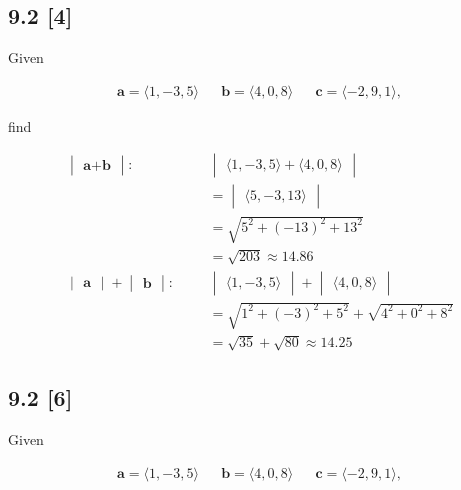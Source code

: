 \documentclass{article}
\begin{document}
\subsection*{9.2 [4]}
\setcounter{equation}{0}

Given

\begin{align}
    \textbf{a} = \langle1, -3, 5\rangle && \textbf{b} = \langle4, 0, 8\rangle && \textbf{c} = \langle-2, 9, 1\rangle,
\end{align}

find

\begin{align}
    \begin{vmatrix}
    \textbf{a} + \textbf{b}
    \end{vmatrix}: && &\text{} \begin{vmatrix}
    \langle1, -3, 5\rangle + \langle4, 0, 8\rangle
    \end{vmatrix}
    \\
    && &= \begin{vmatrix}
    \langle5, -3, 13\rangle
    \end{vmatrix}
    \\
    && &= \sqrt{5^2 + (-13)^2 + 13^2}
    \\
    && &= \sqrt{203} \approx 14.86
    \\
    \begin{vmatrix}
    \textbf{a}
    \end{vmatrix} + \begin{vmatrix}
    \textbf{b}
    \end{vmatrix}: && &\text{} \begin{vmatrix}
    \langle1, -3, 5\rangle
    \end{vmatrix} + \begin{vmatrix}
    \langle4, 0, 8\rangle
    \end{vmatrix}
    \\
    && &= \sqrt{1^2 + (-3)^2 + 5^2} + \sqrt{4^2 + 0^2 + 8^2}
    \\
    && &= \sqrt{35} + \sqrt{80} \approx 14.25
\end{align}

\subsection*{9.2 [6]}
\setcounter{equation}{0}

Given

\begin{align}
    \textbf{a} = \langle1, -3, 5\rangle && \textbf{b} = \langle4, 0, 8\rangle && \textbf{c} = \langle-2, 9, 1\rangle,
\end{align}
\end{document}
